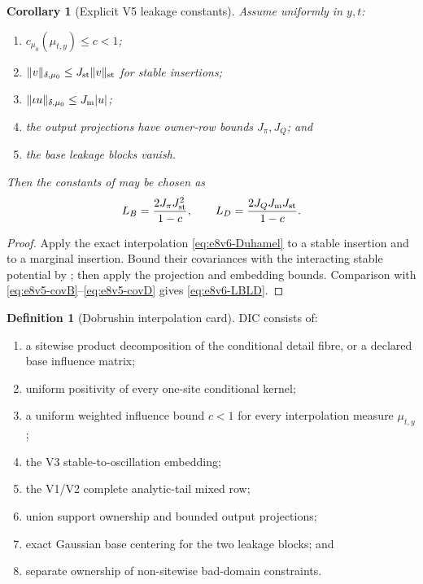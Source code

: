 \documentclass[11pt,oneside]{book}
\newtheorem{corollary}[theorem]{Corollary}
\theoremstyle{definition}
\newtheorem{definition}[theorem]{Definition}
\theoremstyle{remark}
\begin{document}
\begin{corollary}[Explicit V5 leakage constants]
\label{cor:e8v6-LBLD}
Assume uniformly in \(y,t\):
\begin{enumerate}[label=\textup{(\roman*)},leftmargin=3.5em]
\item \(c_{\mu_0}(\mu_{t,y})\le c<1\);
\item \(\|v\|_{\delta,\mu_0}\le J_{\rm st}\|v\|_{\rm st}\) for stable
      insertions;
\item \(\|\iota u\|_{\delta,\mu_0}\le J_{\rm m}|u|\);
\item the output projections have owner-row bounds \(J_\pi,J_Q\);
      and
\item the base leakage blocks vanish.
\end{enumerate}
Then the constants of
 may be chosen as
\[
 L_B=\frac{2J_\pi J_{\rm st}^2}{1-c},
 \qquad
 L_D=\frac{2J_QJ_{\rm m}J_{\rm st}}{1-c}.            \label{eq:e8v6-LBLD}
\]
\end{corollary}

\begin{proof}
Apply the exact interpolation
\eqref{eq:e8v6-Duhamel} to a stable insertion and to a marginal
insertion.  Bound their covariances with the interacting stable
potential by ; then apply the
projection and embedding bounds.  Comparison with
\eqref{eq:e8v5-covB}--\eqref{eq:e8v5-covD} gives
\eqref{eq:e8v6-LBLD}.
\end{proof}

\begin{definition}[Dobrushin interpolation card]
\label{def:e8v6-card}
DIC consists of:
\begin{enumerate}[label=\textup{(D\arabic*)},leftmargin=4em]
\item a sitewise product decomposition of the conditional detail
      fibre, or a declared base influence matrix;
\item uniform positivity of every one-site conditional kernel;
\item a uniform weighted influence bound \(c<1\) for every
      interpolation measure \(\mu_{t,y}\);
\item the V3 stable-to-oscillation embedding;
\item the V1/V2 complete analytic-tail mixed row;
\item union support ownership and bounded output projections;
\item exact Gaussian base centering for the two leakage blocks; and
\item separate ownership of non-sitewise bad-domain constraints.
\end{enumerate}
\end{definition}
\end{document}
